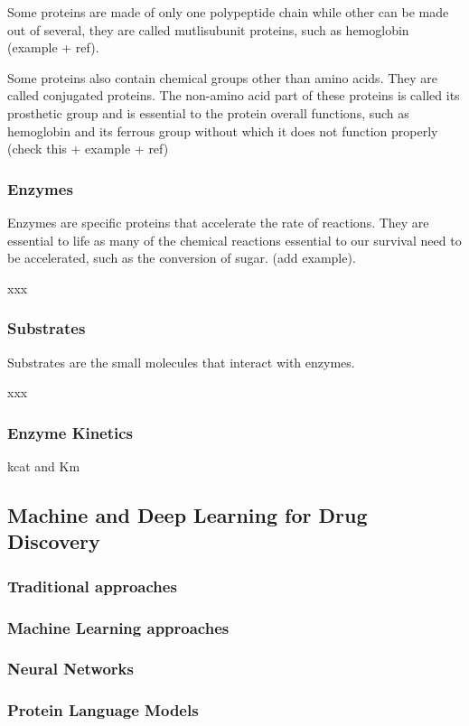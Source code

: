 Some proteins are made of only one polypeptide chain while other can be made out of several, they are 
called mutlisubunit proteins, such as hemoglobin (example + ref).

Some proteins also contain chemical groups other than amino acids. They are called conjugated proteins.
The non-amino acid part of these proteins is called its prosthetic group and is essential to the protein
overall functions, such as hemoglobin and its ferrous group without which it does not function properly 
(check this + example + ref)

\subsubsection{Enzymes}
Enzymes are specific proteins that accelerate the rate of reactions. They are essential to life as many
of the chemical reactions essential to our survival need to be accelerated, such as the conversion of sugar.
(add example). 

xxx
\subsubsection{Substrates}
Substrates are the small molecules that interact with enzymes.

xxx
\subsubsection{Enzyme Kinetics}
kcat and Km

\subsection{Machine and Deep Learning for Drug Discovery}
\subsubsection{Traditional approaches}
\subsubsection{Machine Learning approaches}
\subsubsection{Neural Networks}
\subsubsection{Protein Language Models}
